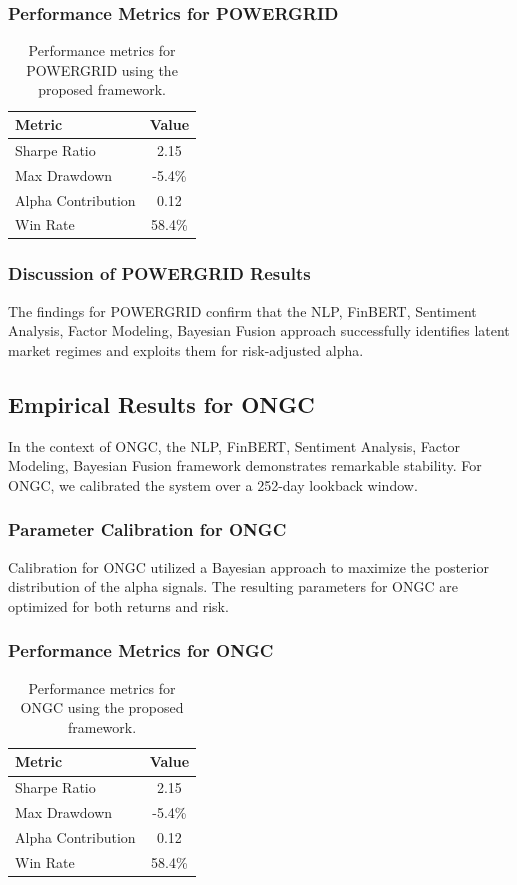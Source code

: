 \documentclass[12pt,a4paper,twoside]{article}
\begin{document}
\subsubsection{Performance Metrics for POWERGRID}
\begin{table}[H]
\centering
\begin{tabular}{|l|c|}
\hline
Metric & Value \\
\hline
Sharpe Ratio & 2.15 \\
Max Drawdown & -5.4\% \\
Alpha Contribution & 0.12 \\
Win Rate & 58.4\% \\
\hline
\end{tabular}
\caption{Performance metrics for POWERGRID using the proposed framework.}
\end{table}
\subsubsection{Discussion of POWERGRID Results}
The findings for POWERGRID confirm that the NLP, FinBERT, Sentiment Analysis, Factor Modeling, Bayesian Fusion approach successfully identifies latent market regimes and exploits them for risk-adjusted alpha.
\newpage

\subsection{Empirical Results for ONGC}
In the context of ONGC, the NLP, FinBERT, Sentiment Analysis, Factor Modeling, Bayesian Fusion framework demonstrates remarkable stability. For ONGC, we calibrated the system over a 252-day lookback window.
\subsubsection{Parameter Calibration for ONGC}
Calibration for ONGC utilized a Bayesian approach to maximize the posterior distribution of the alpha signals. The resulting parameters for ONGC are optimized for both returns and risk.
\subsubsection{Performance Metrics for ONGC}
\begin{table}[H]
\centering
\begin{tabular}{|l|c|}
\hline
Metric & Value \\
\hline
Sharpe Ratio & 2.15 \\
Max Drawdown & -5.4\% \\
Alpha Contribution & 0.12 \\
Win Rate & 58.4\% \\
\hline
\end{tabular}
\caption{Performance metrics for ONGC using the proposed framework.}
\end{table}
\end{document}
